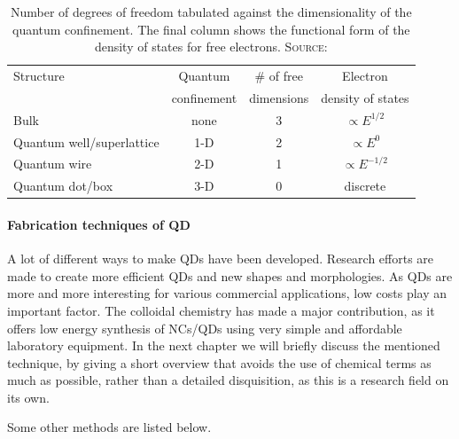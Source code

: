 		\begin{table}[htbp]
		\centering
			\begin{tabular}{lccc}
				Structure											&	Quantum				&	\# of free		&	Electron						\\
																			&	confinement		&	dimensions		&	density of states		\\
				\hline
				Bulk													&	none					&	3							&	$\propto E^{1/2}$		\\
				Quantum well/superlattice			&	1-D						&	2							&	$\propto E^{0}$			\\
				Quantum wire									&	2-D						&	1							&	$\propto E^{-1/2}$	\\
				Quantum dot/box								&	3-D						&	0							&	discrete						\\
			\end{tabular}
			\caption{Number of degrees of freedom tabulated against the dimensionality of the quantum confinement.
							 The final column shows the functional form of the density of states for free electrons.
							 {\scshape Source:} \cite[p.142]{Fox}}
			\label{tbl:ConfinedStr}
		\end{table}
	
	\paragraph{Fabrication techniques of \gls{QD}}
	
		A lot of different ways to make \glspl{QD} have been developed. Research efforts are made to create
		more efficient \glspl{QD} and new shapes and morphologies. As \glspl{QD} are more and more interesting for various commercial applications,
		low costs play an important factor. The colloidal chemistry has made a major contribution, as it offers low energy
		synthesis of \glspl{NC}/\glspl{QD} using very simple and affordable laboratory equipment.		
		In the next chapter we will briefly discuss the mentioned technique, by giving a short overview
		that avoids the use of chemical terms as much as possible, rather than a detailed disquisition, as this is a research field on its own.
		
		Some other methods are listed below.
	
